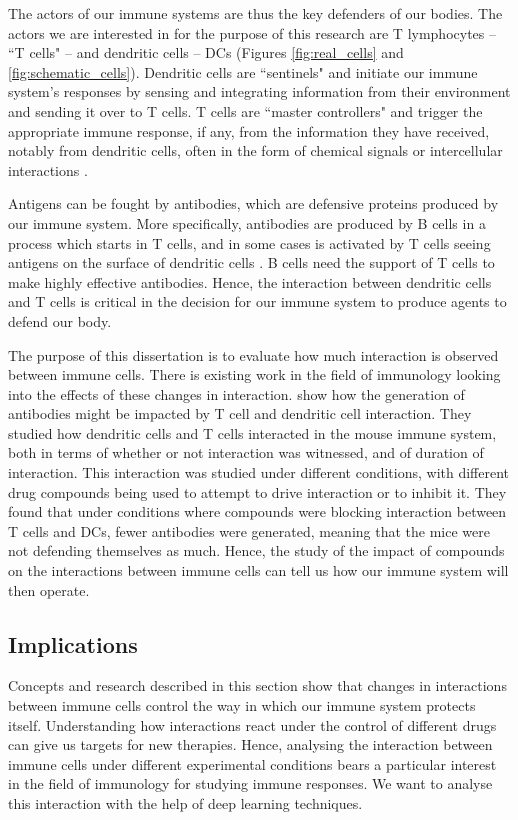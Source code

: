 The actors of our immune systems are thus the key defenders of our bodies. The actors we are interested in for the purpose of this research are T lymphocytes – ``T cells" – and dendritic cells – DCs (Figures \ref{fig:real_cells} and \ref{fig:schematic_cells}). Dendritic cells are ``sentinels" and initiate our immune system's responses by sensing and integrating information from their environment and sending it over to T cells. T cells are ``master controllers" and trigger the appropriate immune response, if any, from the information they have received, notably from dendritic cells, often in the form of chemical signals or intercellular interactions \citep{Brewster15, Rogh20}.

Antigens can be fought by antibodies, which are defensive proteins produced by our immune system. More specifically, antibodies are produced by B cells in a process which starts in T cells, and in some cases is activated by T cells seeing antigens on the surface of dendritic cells \citep{benson_antigen_2015}. B cells need the support of T cells to make highly effective antibodies. Hence, the interaction between dendritic cells and T cells is critical in the decision for our immune system to produce agents to defend our body.

The purpose of this dissertation is to evaluate how much interaction is observed between immune cells. There is existing work in the field of immunology looking into the effects of these changes in interaction. \citet{benson_antigen_2015} show how the generation of antibodies might be impacted by T cell and dendritic cell interaction. They studied how dendritic cells and T cells interacted in the mouse immune system, both in terms of whether or not interaction was witnessed, and of duration of interaction. This interaction was studied under different conditions, with different drug compounds being used to attempt to drive interaction or to inhibit it. They found that under conditions where compounds were blocking interaction between T cells and DCs, fewer antibodies were generated, meaning that the mice were not defending themselves as much. Hence, the study of the impact of compounds on the interactions between immune cells can tell us how our immune system will then operate. 

\subsection{Implications}

Concepts and research described in this section show that changes in interactions between immune cells control the way in which our immune system protects itself. Understanding how interactions react under the control of different drugs can give us targets for new therapies. Hence, analysing the interaction between immune cells under different experimental conditions bears a particular interest in the field of immunology for studying immune responses. We want to analyse this interaction with the help of deep learning techniques. 

